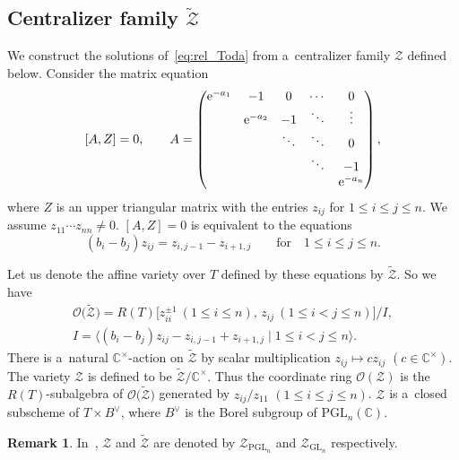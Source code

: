 \documentclass[10pt,a4paper]{amsart}
\numberwithin{equation}{section}
\newcommand{\C}{\mathbb{C}}
\newcommand{\GL}{\mathrm{GL}}
\newcommand{\PGL}{\mathrm{PGL}}
\newcommand{\Rep}{{R(T)}}
\theoremstyle{definition}
\newtheorem{Remark}[Theorem]{Remark}
\begin{document}
\subsection[Centralizer family Z]{Centralizer family $\boldsymbol{\tilde{\mathscr{Z}}}$}
\label{ssec:tZ}
We construct the solutions of~\eqref{eq:rel_Toda} from a~centralizer family $\mathscr{Z}$ defined below.
Consider the matrix equation
\begin{equation}
\label{eq:def-cent}
[A,Z]=0, \qquad
A=\begin{pmatrix}
{\rm e}^{-a_1} & -1 & 0 & \cdots &0\\
 & {\rm e}^{-a_2} & -1 & \ddots &\vdots\\
 & & \ddots & \ddots & 0\\
 & & &\ddots & -1\\
 & & & & {\rm e}^{-a_n}
\end{pmatrix},
\end{equation}
where $Z$ is an upper triangular
matrix with the entries $z_{ij}$ for $1\le i\le j\le n$. We assume $z_{11}\cdots z_{nn}\ne 0$.
$[A,Z]=0$ is equivalent to the equations
\begin{equation}
(b_i-b_j){z}_{ij}={{z}_{i,j-1}-{z}_{i+1,j}}\qquad \text{for} \quad1\le i\le j\le n. \label{eq:cent}
\end{equation}

Let us denote the affine variety over $T$ defined by these equations by $\tilde{\mathscr{Z}}$. So we have
\begin{gather*}
\mathscr{O}\bigl(\tilde{\mathscr{Z}}\bigr)=
\Rep\big[z_{ii}^{\pm 1} \ (1\le i\le n),\,
z_{ij} \ (1\le i< j\le n)
\big]/I,\\
I=\langle
(b_i-b_j)z_{ij}-z_{i,j-1}+z_{i+1,j}
\mid 1\le i< j\le n
\rangle.
\end{gather*}
There is a~natural
$\C^\times$-action
on $\tilde{\mathscr{Z}}$ by scalar
multiplication $z_{ij}\mapsto
cz_{ij}$ $(c\in \C^\times)$.
The variety $\mathscr{Z}$ is defined to be
$\tilde{\mathscr{Z}}/\C^\times$.
Thus the coordinate ring
$\mathscr{O}({\mathscr{Z}})$
is the $\Rep$-subalgebra of $\mathscr{O}\bigl(\tilde{\mathscr{Z}}\bigr)$ generated by
$z_{ij}/z_{11}$
$(1\le i\le j\le n)$.
$\mathscr{Z}$ is a~closed subscheme of
$T\times B^\vee$, where
$B^\vee$ is the
Borel subgroup of $\PGL_n(\C)$.


\begin{Remark}
In~\cite{ISY},
$\mathscr{Z}$ and
$\tilde{\mathscr{Z}}$
are denoted by $\mathscr{Z}_{\PGL_n}$
and $\mathscr{Z}_{\GL_n}$
respectively.
\end{Remark}
\end{document}
